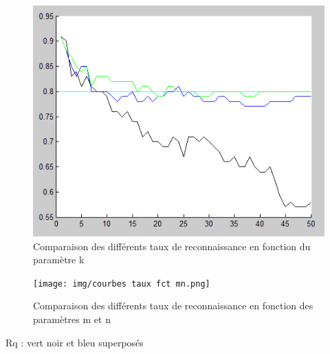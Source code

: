\begin{figure}[h]
	\begin{center}
		\includegraphics{img/courbes taux fct k.png}
	\end{center}
	\caption{Comparaison des différents taux de reconnaissance en fonction du paramètre k}
\end{figure}

\begin{figure}[h]
	\begin{center}
		\texttt{[image: img/courbes taux fct mn.png]}
	\end{center}
	\caption{Comparaison des différents taux de reconnaissance en fonction des paramètres m et n}
\end{figure}
Rq : vert noir et bleu superposés